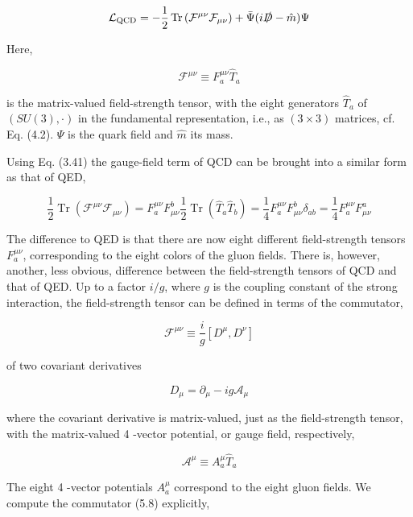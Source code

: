 \documentclass[10pt, letterpaper]{article}
\begin{document}
$$
\mathcal{L}_{\mathrm{QCD}}=-\frac{1}{2} \operatorname{Tr}\left(\mathcal{F}^{\mu \nu} \mathcal{F}_{\mu \nu}\right)+\bar{\Psi}(i \slashed{D}-\hat{m}) \Psi
$$

Here,

$$
\mathcal{F}^{\mu \nu} \equiv F_{a}^{\mu \nu} \hat{T}_{a}
$$

is the matrix-valued field-strength tensor, with the eight generators $\hat{T}_{a}$ of $(S U(3), \cdot)$ in the fundamental representation, i.e., as $(3 \times 3)$ matrices, cf. Eq. (4.2). $\Psi$ is the quark field and $\hat{m}$ its mass.

Using Eq. (3.41) the gauge-field term of QCD can be brought into a similar form as that of QED,

$$
\frac{1}{2} \operatorname{Tr}\left(\mathcal{F}^{\mu \nu} \mathcal{F}_{\mu \nu}\right)=F_{a}^{\mu \nu} F_{\mu \nu}^{b} \frac{1}{2} \operatorname{Tr}\left(\hat{T}_{a} \hat{T}_{b}\right)=\frac{1}{4} F_{a}^{\mu \nu} F_{\mu \nu}^{b} \delta_{a b}=\frac{1}{4} F_{a}^{\mu \nu} F_{\mu \nu}^{a}
$$

The difference to QED is that there are now eight different field-strength tensors $F_{a}^{\mu \nu}$, corresponding to the eight colors of the gluon fields. There is, however, another, less obvious, difference between the field-strength tensors of QCD and that of QED. Up to a factor $i / g$, where $g$ is the coupling constant of the strong interaction, the field-strength tensor can be defined in terms of the commutator,

$$
\mathcal{F}^{\mu \nu} \equiv \frac{i}{g}\left[D^{\mu}, D^{\nu}\right]
$$

of two covariant derivatives

$$
D_{\mu}=\partial_{\mu}-i g \mathcal{A}_{\mu}
$$

where the covariant derivative is matrix-valued, just as the field-strength tensor, with the matrix-valued 4 -vector potential, or gauge field, respectively,

$$
\mathcal{A}^{\mu} \equiv A_{a}^{\mu} \hat{T}_{a}
$$

The eight 4 -vector potentials $A_{a}^{\mu}$ correspond to the eight gluon fields. We compute the commutator (5.8) explicitly,
\end{document}

